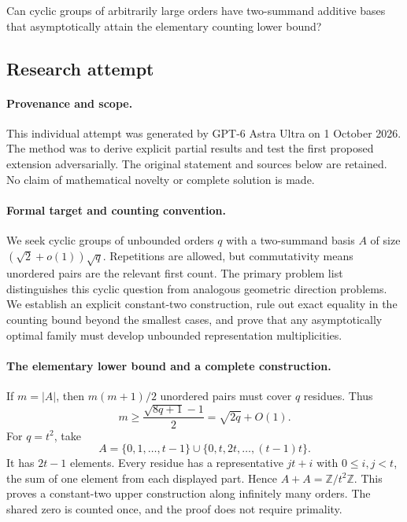 \documentclass[11pt,a4paper]{article}
\newcommand{\Z}{\mathbb{Z}}
\begin{document}
Can cyclic groups of arbitrarily large orders have two-summand additive bases that asymptotically attain the elementary counting lower bound?

\subsection{Research attempt}

\paragraph{Provenance and scope.}
This individual attempt was generated by GPT-6 Astra Ultra on 1 October 2026. The method was to derive explicit partial results and test the first proposed extension adversarially. The original statement and sources below are retained. No claim of mathematical novelty or complete solution is made.

\paragraph{Formal target and counting convention.}
We seek cyclic groups of unbounded orders $q$ with a two-summand basis $A$ of size $(\sqrt2+o(1))\sqrt q$. Repetitions are allowed, but commutativity means unordered pairs are the relevant first count. The primary problem list distinguishes this cyclic question from analogous geometric direction problems. We establish an explicit constant-two construction, rule out exact equality in the counting bound beyond the smallest cases, and prove that any asymptotically optimal family must develop unbounded representation multiplicities.

\paragraph{The elementary lower bound and a complete construction.}
If $m=|A|$, then $m(m+1)/2$ unordered pairs must cover $q$ residues. Thus
\[
 m\geq\frac{\sqrt{8q+1}-1}{2}=\sqrt{2q}+O(1).
\]
For $q=t^2$, take
\[
 A=\{0,1,\ldots,t-1\}\cup\{0,t,2t,\ldots,(t-1)t\}.
\]
It has $2t-1$ elements. Every residue has a representative $jt+i$ with $0\leq i,j<t$, the sum of one element from each displayed part. Hence $A+A=\Z/t^2\Z$. This proves a constant-two upper construction along infinitely many orders. The shared zero is counted once, and the proof does not require primality.
\end{document}

